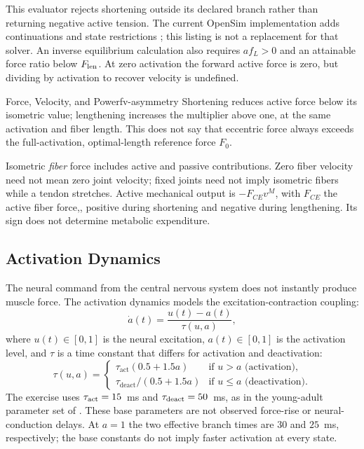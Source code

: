 This evaluator rejects shortening outside its declared branch rather than
returning negative active tension. The current OpenSim implementation adds
continuations and state restrictions \cite{OpenSimThelenPinned}; this listing
is not a replacement for that solver. An inverse equilibrium calculation also
requires $a f_L>0$ and an attainable force ratio below $F_{\rm len}$.
At zero activation the forward active force is zero, but dividing by activation
to recover velocity is undefined.

\begin{principle}{Force, Velocity, and Power}{fv-asymmetry}
 Shortening reduces active force below its isometric value; lengthening
 increases the multiplier above one, at the same activation and fiber length.
 This does not say that eccentric force always exceeds the full-activation,
 optimal-length reference force $F_0$.

 Isometric \emph{fiber} force includes active and passive contributions.
 Zero fiber velocity need not mean zero joint velocity; fixed joints need
 not imply isometric fibers while a tendon stretches. Active mechanical
 output is $-F_{CE}v^M$, with $F_{CE}$ the active fiber force,, positive during shortening and negative during
 lengthening. Its sign does not determine metabolic expenditure.
\end{principle}

\subsection{Activation Dynamics}

The neural command from the central nervous system does not instantly produce
muscle force. The activation dynamics models the excitation-contraction coupling:
\begin{equation}
  \dot{a}(t) = \frac{u(t) - a(t)}{\tau(u, a)},
  \label{eq:ch3:activation-dynamics}
\end{equation}
where $u(t) \in [0, 1]$ is the neural excitation, $a(t) \in [0, 1]$ is the
activation level, and $\tau$ is a time constant that differs for activation
and deactivation:
\begin{equation}
  \tau(u, a) = \begin{cases}
    \tau_{\text{act}}(0.5 + 1.5a) & \text{if } u > a \text{ (activation)}, \\
    \tau_{\text{deact}} / (0.5 + 1.5a) & \text{if } u \leq a \text{ (deactivation)}.
  \end{cases}
  \label{eq:ch3:tau-activation}
\end{equation}
The exercise uses $\tau_{\rm act}=15$~ms and $\tau_{\rm deact}=50$~ms,
as in the young-adult parameter set of \cite{Thelen2003}. These base
parameters are not observed force-rise or neural-conduction delays.
At $a=1$ the two effective branch times are $30$ and $25$~ms, respectively;
the base constants do not imply faster activation at every state.

